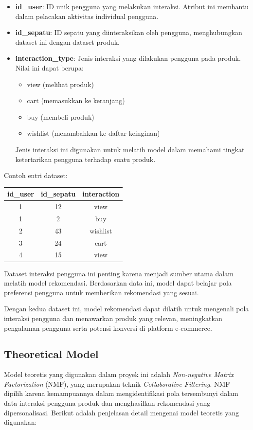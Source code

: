 \documentclass[journal,article,submit,pdftex,moreauthors]{Definitions/mdpi}
\begin{document}
\begin{itemize}
    \item \textbf{id\_user}: ID unik pengguna yang melakukan interaksi. Atribut ini membantu dalam pelacakan aktivitas individual pengguna.
    \item \textbf{id\_sepatu}: ID sepatu yang diinteraksikan oleh pengguna, menghubungkan dataset ini dengan dataset produk.
    \item \textbf{interaction\_type}: Jenis interaksi yang dilakukan pengguna pada produk. Nilai ini dapat berupa:
    \begin{itemize}
        \item view (melihat produk)
        \item cart (memasukkan ke keranjang)
        \item buy (membeli produk)
        \item wishlist (menambahkan ke daftar keinginan)
    \end{itemize}
    Jenis interaksi ini digunakan untuk melatih model dalam memahami tingkat ketertarikan pengguna terhadap suatu produk.
\end{itemize}

Contoh entri dataset:

\begin{table}[h]
\centering
\begin{tabular}{|c|c|c|}
\hline
\textbf{id\_user} & \textbf{id\_sepatu} & \textbf{interaction} \\ \hline
1 & 12 & view \\ \hline
1 & 2 & buy \\ \hline
2 & 43 & wishlist \\ \hline
3 & 24 & cart \\ \hline
4 & 15 & view \\ \hline
\end{tabular}
\end{table}

Dataset interaksi pengguna ini penting karena menjadi sumber utama dalam melatih model rekomendasi. Berdasarkan data ini, model dapat belajar pola preferensi pengguna untuk memberikan rekomendasi yang sesuai.

Dengan kedua dataset ini, model rekomendasi dapat dilatih untuk mengenali pola interaksi pengguna dan menawarkan produk yang relevan, meningkatkan pengalaman pengguna serta potensi konversi di platform e-commerce.


\subsection{Theoretical Model}
Model teoretis yang digunakan dalam proyek ini adalah \textit{Non-negative Matrix Factorization} (NMF), yang merupakan teknik \textit{Collaborative Filtering}. NMF dipilih karena kemampuannya dalam mengidentifikasi pola tersembunyi dalam data interaksi pengguna-produk dan menghasilkan rekomendasi yang dipersonalisasi. Berikut adalah penjelasan detail mengenai model teoretis yang digunakan:
\end{document}
